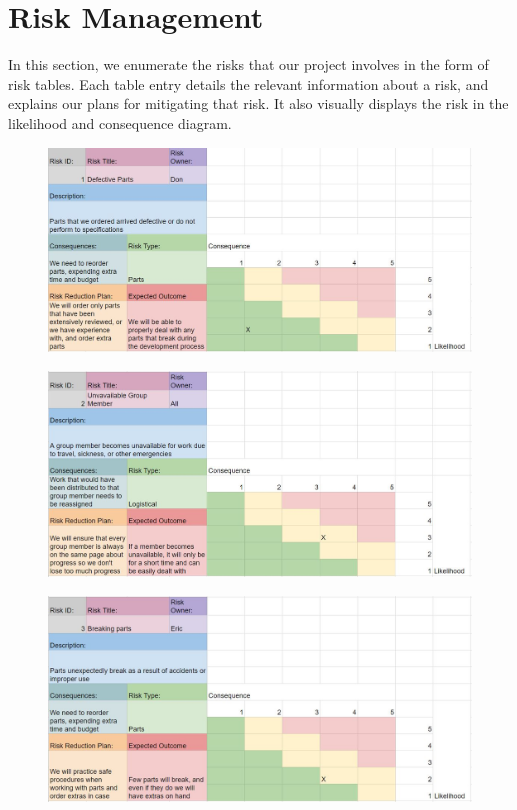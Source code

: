 
\section{Risk Management}
\label{sec:risk_management}


In this section, we enumerate the risks that our project involves in the form of risk tables. Each table entry details the relevant information about a risk, and explains our plans for mitigating that risk. It also visually displays the risk in the likelihood and consequence diagram. 

\begin{figure}[h!]
\centering
\includegraphics[width=0.98\columnwidth]{risks/risk1.JPG}
\label{fig:risk1}
\end{figure}
\begin{figure}[h!]
\centering
\includegraphics[width=0.98\columnwidth]{risks/risk2.JPG}
\label{fig:risk2}
\end{figure}
\begin{figure}[h!]
\centering
\includegraphics[width=0.98\columnwidth]{risks/risk3.JPG}
\label{fig:risk3}
\end{figure}
